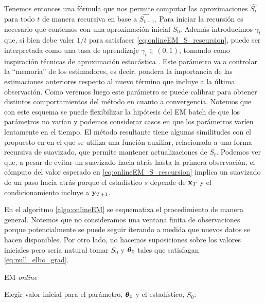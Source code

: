 Tenemos entonces una fórmula que nos permite computar las aproximaciones $\widehat{S_t}$ para todo $t$ de manera recursiva en base a $\widehat{S_{t-1}}$. Para iniciar la recursión es necesario que contemos con una aproximación inicial $S_0$. Además introducimos $\gamma_t$ que, si bien debe valer $1/t$ para satisfacer \ref{eq:onlineEM_S_rescursion}, puede ser interpretada como una tasa de aprendizaje $\gamma_t \in (0, 1)$, tomando como inspiración técnicas de aproximación estocástica \cite{Legland1997}. Este parámetro va a controlar la ``memoria'' de los estimadores, es decir, pondera la importancia de las estimaciones anteriores respecto al nuevo término que incluye a la última observación. Como veremos luego este parámetro se puede calibrar para obtener distintos comportamientos del método en cuanto a convergencia. Notemos que con este esquema se puede flexibilizar la hipótesis del EM batch de que los parámetros no varían y podemos considerar casos en que los parámetros varíen lentamente en el tiempo. El método resultante tiene algunas similitudes con el propuesto en \cite{Cappe2009} en el que se utiliza una función auxiliar, relacionada a una forma recursiva de suavizado, que permite mantener actualizaciones de $S_t$. Podemos ver que, a pesar de evitar un suavizado hacia atrás hasta la primera observación, el cómputo del valor esperado en \ref{eq:onlineEM_S_rescursion} implica un suavizado de un paso hacia atrás porque el estadístico $s$ depende de $\mathbf{x}_T$ y el condicionamiento incluye a $\mathbf{y}_{T+1}$. 

En el algoritmo \ref{algo:onlineEM} se esquematiza el procedimiento de manera general. Notemos que no consideramos una ventana finita de observaciones porque potencialmente se puede seguir iterando a medida que nuevos datos se hacen disponibles. Por otro lado, no hacemos suposiciones sobre los valores iniciales pero sería natural tomar $S_0$ y $\mbox{\boldmath$ \theta $}_0$ tales que satisfagan \ref{eq:null_elbo_grad}.

\begin{algorithm}[h]
\caption{EM \textit{online}}
\label{algo:onlineEM}
    Elegir valor inicial para el parámetro, $\mbox{\boldmath$ \theta $}_0$ y el estadístico, $\widehat{S_0}$: \\
\end{algorithm}

